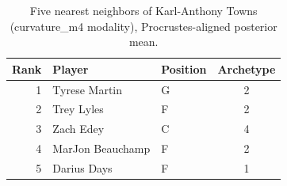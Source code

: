 \begin{table}[htbp]
  \centering\small
  \begin{tabular}{rllc}
    \toprule
    Rank & Player & Position & Archetype \\
    \midrule
    1 & Tyrese Martin & G & 2 \\
    2 & Trey Lyles & F & 2 \\
    3 & Zach Edey & C & 4 \\
    4 & MarJon Beauchamp & F & 2 \\
    5 & Darius Days & F & 1 \\
    \bottomrule
  \end{tabular}
  \caption{Five nearest neighbors of Karl-Anthony Towns (curvature_m4 modality), Procrustes-aligned posterior mean.}
  \label{tab:Karl_Anthony_Towns_neighbors_curvature_m4}
\end{table}

